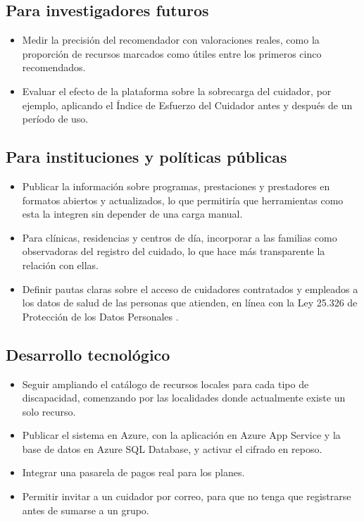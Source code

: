 \subsection{Para investigadores futuros}

\begin{itemize}
    \item Medir la precisión del recomendador con valoraciones reales, como la proporción de recursos marcados como útiles entre los primeros cinco recomendados.
    \item Evaluar el efecto de la plataforma sobre la sobrecarga del cuidador, por ejemplo, aplicando el Índice de Esfuerzo del Cuidador antes y después de un período de uso.
\end{itemize}

\subsection{Para instituciones y políticas públicas}

\begin{itemize}
    \item Publicar la información sobre programas, prestaciones y prestadores en formatos abiertos y actualizados, lo que permitiría que herramientas como esta la integren sin depender de una carga manual.
    \item Para clínicas, residencias y centros de día, incorporar a las familias como observadoras del registro del cuidado, lo que hace más transparente la relación con ellas.
    \item Definir pautas claras sobre el acceso de cuidadores contratados y empleados a los datos de salud de las personas que atienden, en línea con la Ley 25.326 de Protección de los Datos Personales \citep{ley25326}.
\end{itemize}

\subsection{Desarrollo tecnológico}

\begin{itemize}
    \item Seguir ampliando el catálogo de recursos locales para cada tipo de discapacidad, comenzando por las localidades donde actualmente existe un solo recurso.
    \item Publicar el sistema en Azure, con la aplicación en Azure App Service y la base de datos en Azure SQL Database, y activar el cifrado en reposo.
    \item Integrar una pasarela de pagos real para los planes.
    \item Permitir invitar a un cuidador por correo, para que no tenga que registrarse antes de sumarse a un grupo.
\end{itemize}

